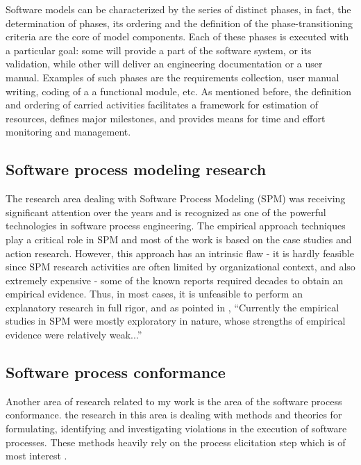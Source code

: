 Software models can be characterized by the series of distinct phases, in fact, the 
determination of phases, its ordering and the definition of the phase-transitioning 
criteria are the core of model components.
Each of these phases is executed with a particular goal: some will provide a part of the 
software system, or its validation, while other will deliver an engineering documentation 
or a user manual. Examples of such phases are the requirements collection, 
user manual writing, coding of a a functional module, etc.
As mentioned before, the definition and ordering of carried activities facilitates
a framework for estimation of resources, defines major milestones, and provides 
means for time and effort monitoring and management. 

\subsection{Software process modeling research}
The research area dealing with Software Process Modeling (SPM) was receiving significant 
attention over the years and is recognized as one of the powerful technologies
in software process engineering. The empirical approach techniques play a critical role
in SPM and most of the work is based on the case studies and action research. 
However, this approach has an intrinsic flaw - it is hardly feasible since
SPM research activities are often limited by organizational context, and also extremely 
expensive - some of the known reports required decades to obtain an empirical evidence.
Thus, in most cases, it is unfeasible to perform an explanatory research in full rigor,
and as pointed in \cite{citeulike:11079867}, ``Currently the empirical studies in SPM were 
mostly exploratory in nature, whose strengths of empirical evidence were relatively weak...''

\subsection{Software process conformance}
Another area of research related to my work is the area of the software process conformance. 
the research in this area is dealing with methods and theories for formulating, identifying and
investigating violations in the execution of software processes. These methods heavily rely
on the process elicitation step which is of most interest . 

